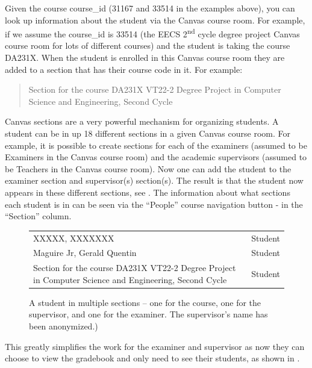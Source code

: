 Given the course course\_id (31167 and 33514 in the examples above), you can look up information about the student via the Canvas course room. For example, if we assume the course\_id is 33514 (the EECS 2\textsuperscript{nd} cycle degree project Canvas course room for lots of different courses) and the student is taking the course DA231X. When the student is enrolled in this Canvas course room they are added to a section that has their course code in it. For example:
\begin{quote}
    Section for the course DA231X VT22-2 Degree Project in Computer Science and Engineering, Second Cycle
\end{quote}

Canvas sections are a very powerful mechanism for organizing students. A student can be in up 18 different sections in a given Canvas course room. For example, it is possible to create sections for each of the examiners (assumed to be Examiners in the Canvas course room) and the academic supervisors (assumed to be Teachers in the Canvas course room). Now one can add the student to the examiner section and supervisor(s) section(s). The result is that the student now appears in these different sections, see . The information about what sections each student is in can be seen via the ``People'' course navigation button - in the ``Section'' column.

\begin{figure}[!ht]
  \begin{center}
    \small
    \begin{tabular}{p{9cm} p{2cm}} 
    XXXXX, XXXXXXX & Student \\
    Maguire Jr, Gerald Quentin & Student \\
    Section for the course DA231X VT22-2 Degree Project in Computer Science and Engineering, Second Cycle & Student \\
 \end{tabular}
  \end{center}
  \caption{A student in multiple sections – one for the course, one for the supervisor, and one for the examiner. The supervisor's name has been anonymized.)}
  \label{fig:studentInMultipleSections}
\end{figure}

This greatly simplifies the work for the examiner and supervisor as now they can choose to view the gradebook and only need to see their students, as shown in .
 	
